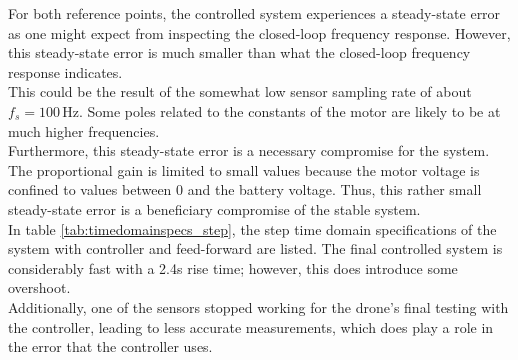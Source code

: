 \begin{table}[h]
\centering
{}
\caption{Time domain specifications for system with controller and feed-forward}
\label{tab:timedomainspecs_step}
\end{table}
For both reference points, the controlled system experiences a steady-state error as one might expect from inspecting the closed-loop frequency response. However, this steady-state error is much smaller than what the closed-loop frequency response indicates.\\
This could be the result of the somewhat low sensor sampling rate of about $f_{s} = 100 \,\text{Hz}$. Some poles related to the constants of the motor are likely to be at much higher frequencies.\\
Furthermore, this steady-state error is a necessary compromise for the system. The proportional gain is limited to small values because the motor voltage is confined to values between 0 and the battery voltage. Thus, this rather small steady-state error is a beneficiary compromise of the stable system. \\
In table \ref{tab:timedomainspecs_step}, the step time domain specifications of the system with controller and feed-forward are listed. The final controlled system is considerably fast with a 2.4s rise time; however, this does introduce some overshoot.\\

Additionally, one of the sensors stopped working for the drone's final testing with the controller, leading to less accurate measurements, which does play a role in the error that the controller uses.



